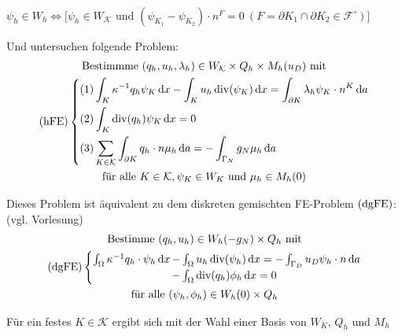 \begin{remark}~
	
	$ \psi_h \in W_h \iff \big[ \psi_h \in W_{\mathcal{K}} \text{ und }  (\psi_{K_1} - \psi_{K_2}) \cdot n^F = 0 \ (F= \partial K_1 \cap \partial K_2 \in \mathcal{F}^{\circ})\big] $
\end{remark}


Und untersuchen folgende Problem:
\begin{gather*}
	\text{Bestimmme } (q_h,u_h, \lambda_h) \in W_\mathcal{K} \times Q_h \times M_h(u_D) \text{ mit}\\
	\operatorname{(hFE)}\begin{dcases}
		(1) \int_K \kappa^{-1} q_h \psi_K \mathop{}\!\mathrm{d} x - \int_K u_h \operatorname{div}(\psi_K) \mathop{}\!\mathrm{d} x = \int_{\partial K} \lambda_h \psi_K \cdot n^K \mathop{}\!\mathrm{d} a \\
		(2) \int_K \operatorname{div}(q_h) \psi_K \mathop{}\!\mathrm{d} x = 0\\
		(3) \sum_{K\in \mathcal{K}} \int_{\partial K} q_h \cdot n \mu_h \mathop{}\!\mathrm{d} a = - \int_{\Gamma_N} g_N \mu_h \mathop{}\!\mathrm{d} a
	\end{dcases}\\
	\text{für alle } K \in \mathcal{K}, \psi_K \in W_K  \text{ und } \mu_h \in M_h(0)
\end{gather*}

Dieses Problem ist äquivalent zu dem diskreten gemischten FE-Problem $ \operatorname{(dgFE)} $: (vgl. Vorlesung)
\begin{gather*}
\text{Bestimme } (q_h,u_h) \in W_h(-g_N) \times Q_h \text{ mit}\\
\operatorname{(dgFE)}\begin{cases}
\int_{\Omega} \kappa ^{-1} q_h \cdot \psi_h \mathop{}\!\mathrm{d} x \mkern-15mu &- \int_{\Omega} u_h \operatorname{div}(\psi_h) \mathop{}\!\mathrm{d} x = - \int_{\Gamma_D} u_D \psi_h \cdot n \mathop{}\!\mathrm{d} a\\
&- \int_{\Omega} \operatorname{div}(q_h) \phi_h \mathop{}\!\mathrm{d} x = 0
\end{cases} \\
\text{für alle } (\psi_h, \phi_h) \in W_h(0) \times Q_h
\end{gather*}

Für ein festes $ K \in \mathcal{K} $ ergibt sich mit der Wahl einer Basis von $ W_K $, $ Q_h $ und $ M_h $ 
 
